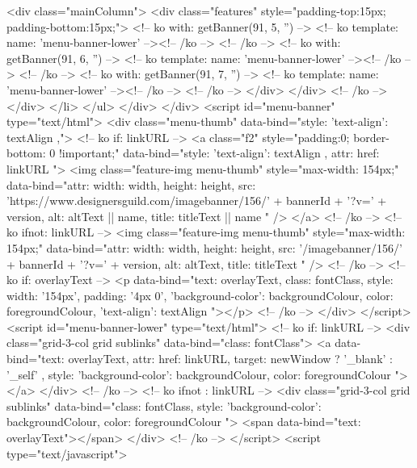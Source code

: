 <div class="mainColumn">
<div class="features" style="padding-top:15px; padding-bottom:15px;">
<!-- ko with: getBanner(91, 5, '') -->
<!-- ko template: { name: 'menu-banner-lower' } --><!-- /ko -->
<!-- /ko -->
<!-- ko with: getBanner(91, 6, '') -->
<!-- ko template: { name: 'menu-banner-lower' } --><!-- /ko -->
<!-- /ko -->
<!-- ko with: getBanner(91, 7, '') -->
<!-- ko template: { name: 'menu-banner-lower' } --><!-- /ko -->
<!-- /ko -->
</div>
</div>
<!-- /ko -->
</div>
</li>
</ul>
</div>
</div>
<script id="menu-banner" type="text/html">
    <div class="menu-thumb" data-bind="style: { 'text-align': textAlign },">
        <!-- ko if: linkURL -->
        <a class="f2" style="padding:0; border-bottom: 0 !important;" data-bind="style: { 'text-align': textAlign }, attr: { href: linkURL }">
            <img class="feature-img menu-thumb" style="max-width: 154px;" data-bind="attr: { width: width, height: height, src: 'https://www.designersguild.com/imagebanner/156/' + bannerId + '?v=' + version, alt: altText || name, title: titleText || name }" />
        </a>
        <!-- /ko -->
        <!-- ko ifnot: linkURL -->
        <img class="feature-img menu-thumb" style="max-width: 154px;" data-bind="attr: { width: width, height: height, src: '/imagebanner/156/' + bannerId + '?v=' + version, alt: altText, title: titleText }" />
        <!-- /ko -->
        <!-- ko if: overlayText -->
        <p data-bind="text: overlayText, class: fontClass, style: { width: '154px', padding: '4px 0', 'background-color': backgroundColour, color: foregroundColour, 'text-align': textAlign }"></p>
        <!-- /ko -->
    </div>
</script>
<script id="menu-banner-lower" type="text/html">
    <!-- ko if: linkURL -->
    <div class="grid-3-col grid sublinks" data-bind="class: fontClass">
        <a data-bind="text: overlayText, attr: { href: linkURL, target: newWindow ? '_blank' : '_self' }, style: { 'background-color': backgroundColour, color: foregroundColour }"></a>
    </div>
    <!-- /ko -->
    <!-- ko ifnot : linkURL -->
    <div class="grid-3-col grid sublinks" data-bind="class: fontClass, style: { 'background-color': backgroundColour, color: foregroundColour }">
        <span data-bind="text: overlayText"></span>
    </div>
    <!-- /ko -->
</script>
<script type="text/javascript">
